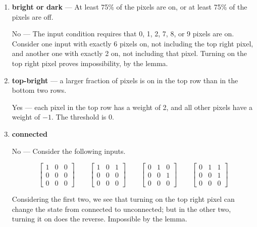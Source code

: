 \documentclass{article}
\newcommand{\mat}[1]{\begin{bmatrix}#1\end{bmatrix}}
\begin{document}
  \begin{enumerate}
  \item \textbf{bright or dark} --- At least 75\% of the pixels are
    on, or at least 75\% of the pixels are off.

    No --- The input condition requires that 0, 1, 2, 7, 8, or 9
    pixels are on. Consider one input with exactly 6 pixels on, not
    including the top right pixel, and another one with exactly 2 on,
    not including that pixel. Turning on the top right pixel proves
    impossibility, by the lemma.

  \item \textbf{top-bright} --- a larger fraction of pixels is on in
    the top row than in the bottom two rows.

    Yes --- each pixel in the top row has a weight of 2, and all other
    pixels have a weight of $-1$. The threshold is 0.


  \item \textbf{connected}

    No --- Consider the following inputs.

    \[\mat{1&0&0\\0&0&0\\0&0&0}\qquad\mat{1&0&1\\0&0&0\\0&0&0}\qquad\mat{0&1&0\\0&0&1\\0&0&0}\qquad\mat{0&1&1\\0&0&1\\0&0&0}\]

    Considering the first two, we see that turning on the top right
    pixel can change the state from connected to unconnected; but in
    the other two, turning it on does the reverse. Impossible by the
    lemma.
  \end{enumerate}
\end{document}
